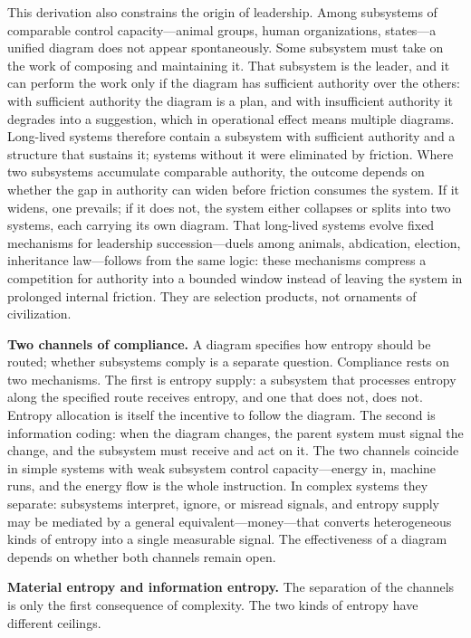 \documentclass[11pt,a4paper]{article}
\begin{document}
This derivation also constrains the origin of leadership. Among subsystems of comparable control capacity---animal groups, human organizations, states---a unified diagram does not appear spontaneously. Some subsystem must take on the work of composing and maintaining it. That subsystem is the leader, and it can perform the work only if the diagram has sufficient authority over the others: with sufficient authority the diagram is a plan, and with insufficient authority it degrades into a suggestion, which in operational effect means multiple diagrams. Long-lived systems therefore contain a subsystem with sufficient authority and a structure that sustains it; systems without it were eliminated by friction. Where two subsystems accumulate comparable authority, the outcome depends on whether the gap in authority can widen before friction consumes the system. If it widens, one prevails; if it does not, the system either collapses or splits into two systems, each carrying its own diagram. That long-lived systems evolve fixed mechanisms for leadership succession---duels among animals, abdication, election, inheritance law---follows from the same logic: these mechanisms compress a competition for authority into a bounded window instead of leaving the system in prolonged internal friction. They are selection products, not ornaments of civilization.

\textbf{Two channels of compliance.} A diagram specifies how entropy should be routed; whether subsystems comply is a separate question. Compliance rests on two mechanisms. The first is entropy supply: a subsystem that processes entropy along the specified route receives entropy, and one that does not, does not. Entropy allocation is itself the incentive to follow the diagram. The second is information coding: when the diagram changes, the parent system must signal the change, and the subsystem must receive and act on it. The two channels coincide in simple systems with weak subsystem control capacity---energy in, machine runs, and the energy flow is the whole instruction. In complex systems they separate: subsystems interpret, ignore, or misread signals, and entropy supply may be mediated by a general equivalent---money---that converts heterogeneous kinds of entropy into a single measurable signal. The effectiveness of a diagram depends on whether both channels remain open.

\textbf{Material entropy and information entropy.} The separation of the channels is only the first consequence of complexity. The two kinds of entropy have different ceilings.
\end{document}

